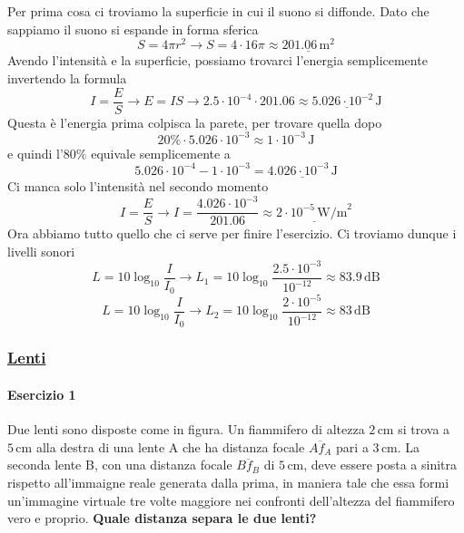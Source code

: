 Per prima cosa ci troviamo la superficie in cui il suono si diffonde. Dato che sappiamo il suono
si espande in forma sferica
\begin{equation*}
S = 4\pi r^2 \rightarrow S = 4\cdot16\pi \approx \underline{201.06\,\text{m}^2}
\end{equation*}
Avendo l'intensità e la superficie, possiamo trovarci l'energia semplicemente invertendo la formula
\begin{equation*}
I = \frac{E}{S} \rightarrow E = IS \rightarrow 2.5\cdot10^{-4}\cdot 201.06 \approx 
\underline{5.026\cdot10^{-2}\,\text{J}}
\end{equation*}
Questa è l'energia prima colpisca la parete, per trovare quella dopo
\begin{equation*}
20\%\cdot 5.026\cdot10^{-3} \approx 1\cdot10^{-3}\,\text{J}
\end{equation*}
e quindi l'$80\%$ equivale semplicemente a
\begin{equation*}
5.026\cdot10^{-4} - 1\cdot10^{-3} = \underline{4.026\cdot10^{-3}\,\text{J}}
\end{equation*}
Ci manca solo l'intensità nel secondo momento
\begin{equation*}
I = \frac{E}{S} \rightarrow I = \frac{4.026\cdot10^{-3}}{201.06} \approx
\underline{2\cdot10^{-5}\,\text{W/m}^2}
\end{equation*}
Ora abbiamo tutto quello che ci serve per finire l'esercizio. Ci troviamo dunque i livelli sonori
\begin{equation*}
L = 10\log_{10}\frac{I}{I_0} \rightarrow L_1 = 10\log_{10}\frac{2.5\cdot10^{-3}}{10^{-12}}
\approx\boxed{83.9\,\text{dB}}
\end{equation*}
\begin{equation*}
L = 10\log_{10}\frac{I}{I_0} \rightarrow L_2 = 10\log_{10}\frac{2\cdot10^{-5}}{10^{-12}}
\approx\boxed{83\,\text{dB}}
\end{equation*}

\subsubsection*{\hyperref[subsec:onde:lenti]{Lenti}}\label{ex:lenti}
\paragraph{Esercizio 1}
Due lenti sono disposte come in figura. Un fiammifero di altezza $2\,\text{cm}$ si trova a 
$5\,\text{cm}$ alla destra di una lente A che ha distanza focale $\overline{Af_A}$ pari a 
$3\,\text{cm}$. La seconda lente B, con una distanza focale $\overline{Bf_B}$ di $5\,\text{cm}$, 
deve essere posta a sinitra rispetto all'immaigne reale generata dalla prima, in maniera tale che 
essa formi un'immagine virtuale tre volte maggiore nei confronti dell'altezza del fiammifero vero e 
proprio. \textbf{Quale distanza separa le due lenti?}

